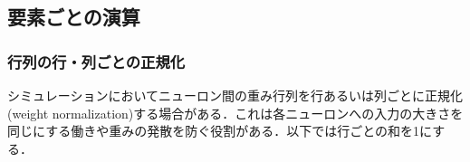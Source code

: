 \subsection{要素ごとの演算}
\subsubsection{行列の行・列ごとの正規化}
シミュレーションにおいてニューロン間の重み行列を行あるいは列ごとに正規化 (weight normalization)する場合がある．これは各ニューロンへの入力の大きさを同じにする働きや重みの発散を防ぐ役割がある．以下では行ごとの和を1にする．

